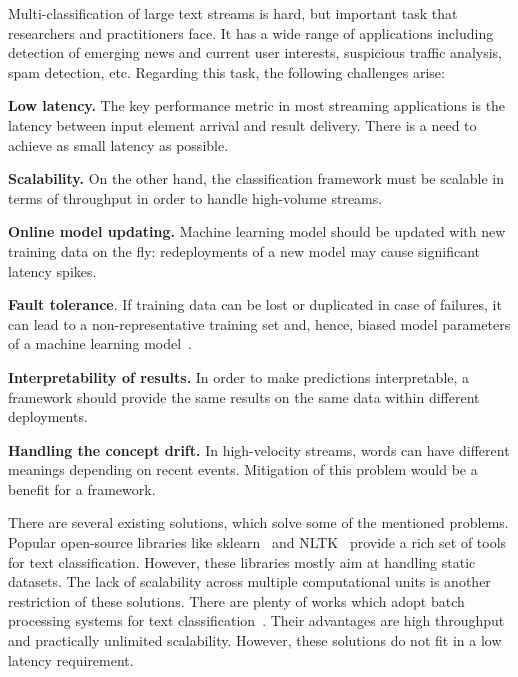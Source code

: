 \label {fs-short-intro}

Multi-classification of large text streams is hard, but important task that researchers and practitioners face. It has a wide range of applications including detection of emerging news and current user interests, suspicious traffic analysis, spam detection, etc. Regarding this task, the following challenges arise:

\textbf{Low latency.} The key performance metric in most streaming applications is the latency between input element arrival and result delivery. There is a need to achieve as small latency as possible.

\textbf{Scalability.} On the other hand, the classification framework must be scalable in terms of throughput in order to handle high-volume streams.

\textbf{Online model updating.} Machine learning model should be updated with new training data on the fly: redeployments of a new model may cause significant latency spikes.

\textbf{Fault tolerance}. If training data can be lost or duplicated in case of failures, it can lead to a non-representative training set and, hence, biased model parameters of a machine learning model~\cite{Baylor:2017:TTP:3097983.3098021}.

\textbf{Interpretability of results.} In order to make predictions interpretable, a framework should provide the same results on the same data within different deployments.

\textbf{Handling the concept drift.} In high-velocity streams, words can have different meanings depending on recent events. Mitigation of this problem would be a benefit for a framework.

There are several existing solutions, which solve some of the mentioned problems. Popular open-source libraries like sklearn~\cite{sklearn_api} and NLTK~\cite{bird2009natural} provide a rich set of tools for text classification. However, these libraries mostly aim at handling static datasets. The lack of scalability across multiple computational units is another restriction of these solutions. There are plenty of works which adopt batch processing systems for text classification~\cite{semberecki2016distributed, svyatkovskiy2016large, baltas2016apache, Nodarakis2016LargeSS}. Their advantages are high throughput and practically unlimited scalability. However, these solutions do not fit in a low latency requirement.

